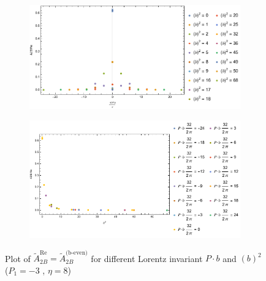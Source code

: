 \documentclass[]{article}
\numberwithin{equation}{section}
\newcommand{\tAmp}{\widetilde{A}}
\newcommand{\tAmp}{\ensuremath{\widetilde{A}^{(+)}}}
\begin{document}
\begin{figure}[h!]
     \centering
     \begin{subfigure}[b]{0.45\textwidth}
         \centering
         \includegraphics[width=\textwidth]{Amp_plots/bP_A2B_b_even_P1_-3_eta_8.pdf}
     \end{subfigure}
     \begin{subfigure}[b]{0.45\textwidth}
         \centering
         \includegraphics[width=\textwidth]{Amp_plots/bsq_A2B_b_even_P1_-3_eta_8.pdf}
     \end{subfigure}
        \caption{Plot of $\tAmp^{\text{Re}}_{2B}=\tAmp^{\text{(b-even)}}_{2B}$ for different Lorentz invariant $P\cdot b$ and $(b)^2$  ($P_{1} = -3$ , $\eta=8$)}
\end{figure}
\end{document}
